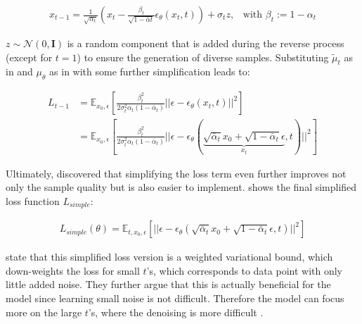 \begin{equation}
  \begin{align*}
    \label{eqn:xt-1}
    x_{t-1} = \frac{1}{\sqrt{\alpha_t}}\left(x_t - \frac{\beta_t}{\sqrt{1-\bar{\alpha}t}}\epsilon_{\theta}(x_t,t)\right) + \sigma_t z \textrm{,}\quad
    \textrm{with } \beta_t := 1-\alpha_t
  \end{align*}
\end{equation}

\noindent $z\sim\mathcal{N}(0,\textbf{I})$ is a random component that is added during the reverse process (except for $t=1$) to ensure the generation of diverse samples.
\newpage
Substituting $\tilde{\mu}_t$ as in  and $\mu_\theta$ as in  with some further simplification leads to:

\begin{equation}
  \begin{align*}
    \label{eqn:eqn:lt-1_4}
    L_{t-1} &= \mathbb{E}_{x_0,\epsilon} \left[  \frac{\beta^2_t}{2\sigma_t^2 \alpha_t (1-\bar{\alpha}_t)} ||\epsilon - \epsilon_\theta(x_t,t)||^2 \right] \\
    &= \mathbb{E}_{x_0,\epsilon} \left[  \frac{\beta^2_t}{2\sigma_t^2 \alpha_t (1-\bar{\alpha}_t)} ||\epsilon - \epsilon_\theta( \underbrace{\sqrt{\bar{\alpha}_t} x_0 + \sqrt{1-\bar{\alpha}_t}\epsilon}_{x_t}, t)||^2 \right]
  \end{align*}
\end{equation}

Ultimately, \textcite[p. 5]{ho2020DenoisingDiffusionProbabilistic} discovered that simplifying the loss term even further improves not only the sample quality but is also easier to implement.
 shows the final simplified loss function $L_{simple}$:

\begin{equation}
  \begin{align*}
    \label{eqn:l_simple}
    L_{simple}(\theta) = \mathbb{E}_{t, x_0,\epsilon} \left[ ||\epsilon - \epsilon_\theta( \sqrt{\bar{\alpha}_t} x_0 + \sqrt{1-\bar{\alpha}_t}\epsilon, t)||^2 \right]
  \end{align*}
\end{equation}

\textcite{ho2020DenoisingDiffusionProbabilistic} state that this simplified loss version is a weighted variational bound, which down-weights the loss for small $t$'s, which corresponds to data point with only little added noise.
They further argue that this is actually beneficial for the \gls{model} since learning small noise is not difficult. 
Therefore the \gls{model} can focus more on the large $t$'s, where the denoising is more difficult \cite{ho2020DenoisingDiffusionProbabilistic}.

